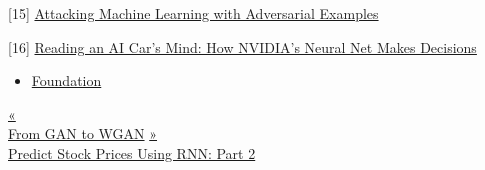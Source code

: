 {[}15{]} \href{https://blog.openai.com/adversarial-example-research/}{Attacking Machine Learning with Adversarial Examples}

{[}16{]} \href{https://blogs.nvidia.com/blog/2017/04/27/how-nvidias-neural-net-makes-decisions/}{Reading an AI Car's Mind: How NVIDIA's Neural Net Makes Decisions}

\begin{itemize}
\tightlist
\item
  \href{https://lilianweng.github.io/tags/foundation/}{Foundation}
\end{itemize}

\href{https://lilianweng.github.io/posts/2017-08-20-gan/}{{« }\\
{From GAN to WGAN}} \href{https://lilianweng.github.io/posts/2017-07-22-stock-rnn-part-2/}{{ »}\\
{Predict Stock Prices Using RNN: Part 2}}

